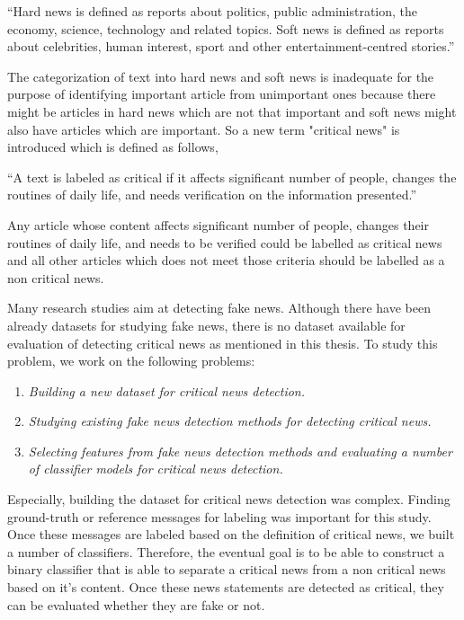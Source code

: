 \enquote{Hard news is defined as reports about politics, public administration, the economy, science, technology and related topics. Soft news is defined as reports about celebrities, human interest, sport and other entertainment-centred stories.}

The categorization of text into hard news and soft news is inadequate for the purpose of identifying important article from unimportant ones because there might be articles in hard news which are not that important and soft news might also have articles which are important. So a new term "critical news" is introduced which is defined as follows,

\enquote{A text is labeled as critical if it affects significant number of people, changes the routines of daily life, and needs verification on the information presented.}

Any article whose content affects significant number of people, changes their routines of daily life, and needs to be verified could be labelled as critical news and all other articles which does not meet those criteria should be labelled as a non critical news. 

Many research studies aim at detecting fake news. Although there have been already datasets for studying fake news, there is no dataset available for evaluation of detecting critical news as mentioned in this thesis. To study this problem, we work on the following problems:

\begin{enumerate}
    \item \textit{Building a new dataset for critical news detection.}
    \item \textit{Studying existing fake news detection methods for detecting critical news.}
    \item \textit{Selecting features from fake news detection methods and evaluating a number of classifier models for critical news detection.}
\end{enumerate}

Especially, building the dataset for critical news detection was complex. Finding ground-truth or reference messages for labeling was important for this study. Once these messages are labeled based on the definition of critical news, we built a number of classifiers.
Therefore, the eventual goal is to be able to construct a binary classifier that is able to separate a critical news from a non critical news based on it's content. Once these news statements are detected as critical, they can be evaluated whether they are fake or not.



